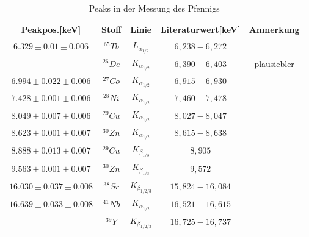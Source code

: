 \documentclass[12pt,a4paper]{article}
\begin{document}
\begin{table}[H]
\center
\begin{tabular}{|c|c|c|c|c|}
\hline 
Peakpos.[keV] & Stoff & Linie & Literaturwert[keV] & Anmerkung \\
\hline 
$6.329 \pm 0.01 \pm 0.006$& $^{65}Tb$ & $L_{\alpha_{1/2}}$ & $6,238-6,272$ & \\
& $^{26}De$ & $K_{\alpha_{1/2}}$ & $6,390-6,403$ & plausiebler\\
\hline 
$6.994 \pm 0.022 \pm 0.006$ & $^{27}Co$ & $K_{\alpha_{1/2}}$ & $6,915-6,930$ & \\ 
\hline 
$7.428 \pm 0.001 \pm 0.006$ & $^{28}Ni$ & $K_{\alpha_{1/2}}$ & $7,460-7,478$ & \\
\hline
$8.049 \pm 0.007 \pm 0.006$ & $^{29}Cu$ & $K_{\alpha_{1/2}}$ & $8,027-8,047$ & \\
\hline
$8.623 \pm 0.001 \pm 0.007$ & $^{30}Zn$ & $K_{\alpha_{1/2}}$ & $8,615-8,638$ & \\
\hline
$8.888 \pm 0.013 \pm 0.007$ & $^{29}Cu$ & $K_{\beta_{1/3}}$ & $8,905$ & \\
\hline
$9.563 \pm 0.001 \pm 0.007$ & $^{30}Zn$ & $K_{\beta_{1/3}}$ & $9,572$ & \\
\hline
$16.030 \pm 0.037 \pm 0.008$ & $^{38}Sr$ & $K_{\beta_{1/2/3}}$ & $15,824-16,084$ & \\
\hline
$16.639 \pm 0.033 \pm 0.008$ & $^{41}Nb$ & $K_{\alpha_{1/2}}$ & $16,521-16,615$ & \\
& $^{39}Y$ & $K_{\beta_{1/2/3}}$ & $16,725-16,737$ & \\
\hline
\end{tabular} 
\caption{Peaks in der Messung des Pfennigs}
\label{a_peaks_leer}
\end{table}

\newpage
\end{document}
